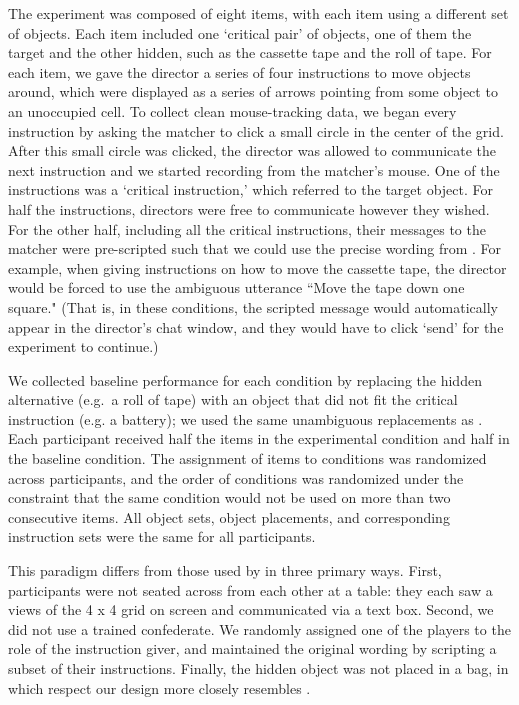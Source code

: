 \documentclass[10pt,letterpaper]{article}
\begin{document}
The experiment was composed of eight items, with each item using a different set of objects. Each item included one `critical pair' of objects, one of them the target and the other hidden, such as the cassette tape and the roll of tape. For each item, we gave the director a series of four instructions to move objects around, which were displayed as a series of arrows pointing from some object to an unoccupied cell. 
To collect clean mouse-tracking data, we began every instruction by asking the matcher to click a small circle in the center of the grid. After this small circle was clicked, the director was allowed to communicate the next instruction and we started recording from the matcher's mouse. 
One of the instructions was a `critical instruction,' which referred to the target object.
For half the instructions, directors were free to communicate however they wished. For the other half, including all the critical instructions, their messages to the matcher were pre-scripted such that we could use the precise wording from . For example, when giving instructions on how to move the cassette tape, the director would be forced to use the ambiguous utterance ``Move the tape down one square." (That is, in these conditions, the scripted message would automatically appear in the director's chat window, and they would have to click `send' for the experiment to continue.)

We collected baseline performance for each condition by replacing the hidden alternative (e.g.~a roll of tape) with an object that did not fit the critical instruction (e.g. a battery); we used the same unambiguous replacements as . Each participant received half the items in the experimental condition and half in the baseline condition. The assignment of items to conditions was randomized across participants, and the order of conditions was randomized under the constraint that the same condition would not be used on more than two consecutive items. All object sets, object placements, and corresponding instruction sets were the same for all participants.

This paradigm differs from those used by  in three primary ways. First, participants were not seated across from each other at a table: they each saw a views of the 4 x 4 grid on screen and communicated via a text box. Second, we did not use a trained confederate. We randomly assigned one of the players to the role of the instruction giver, and maintained the original wording by scripting a subset of their instructions. Finally, the hidden object was not placed in a bag, in which respect our design more closely resembles .
\end{document}
